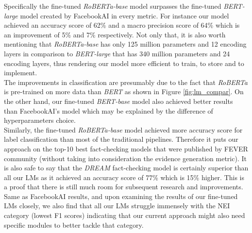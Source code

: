 \documentclass[conference]{IEEEtran}
\begin{document}
Specifically the fine-tuned \textit{RoBERTa-base} model surpasses the fine-tuned \textit{BERT-large} model created by FacebookAI in every metric. For instance our model achieved an accuracy score of 62\% and a macro precision score of 64\% which is an improvement of 5\% and 7\% respectively. Not only that, it is also worth mentioning that \textit{RoBERTa-base} has only 125 million parameters and 12 encoding layers in comparison to \textit{BERT-large} that has 340 million parameters and 24 encoding layers, thus rendering our model more efficient to train, to store and to implement.\\

The improvements in classification are presumably due to the fact that \textit{RoBERTa} is pre-trained on more data than \textit{BERT} as shown in Figure \ref{fig:lm_compar}. On the other hand, our fine-tuned \textit{BERT-base} model also achieved better results than FacebookAI's model which may be explained by the difference of hyperparameters choice.\\

Similarly, the fine-tuned \textit{RoBERTa-base} model achieved more accuracy score for label classification than most of the traditional pipelines. Therefore it puts our approach on the top-10 best fact-checking models that were published by FEVER community\cite{thorne2018fact} (without taking into consideration the evidence generation metric). It is also safe to say that the \textit{DREAM} fact-checking model is certainly superior than all our LMs as it achieved an accuracy score of 77\% which is 15\% higher. This is a proof that there is still much room for subsequent research and improvements.\\

Same as FacebookAI results\cite{lee2020language}, and upon examining the results of our fine-tuned LMs closely, we also find that all our LMs struggle immensely with the NEI category (lowest F1 scores) indicating that our current approach might also need specific modules to better tackle that category.\\

\end{document}

